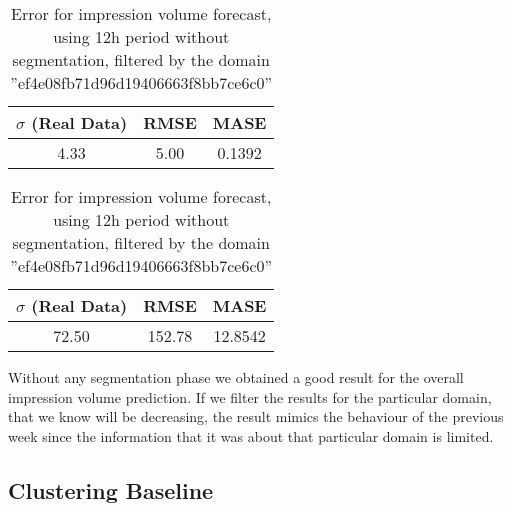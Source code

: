 \begin{table}[!ht]
\centering
\footnotesize
\begin{minipage}[t]{0.45\linewidth}
\centering
\footnotesize
\begin{tabular}{ccc}
 $\sigma$ (Real Data) & RMSE & MASE   \\ \hline
4.33 & 5.00 & 0.1392 \\
\end{tabular}

\vspace{0.5cm}

\caption[Volume
impression forecast, safari]{Error for impression volume
forecast, using 12h period without segmentation }
\label{tab:err_domain_wo_segmentation}
\end{minipage}
\quad
\begin{minipage}[t]{0.45\linewidth}
\centering
\footnotesize
\begin{tabular}{ccc}
 $\sigma$ (Real Data) & RMSE & MASE   \\ \hline
72.50 & 152.78 & 12.8542 \\
\end{tabular}

\vspace{0.5cm}

\caption[Volume
impression forecast, safari]{Error for impression volume
forecast, using 12h period without segmentation, filtered by the domain ''ef4e08fb71d96d19406663f8bb7ce6c0'' }
\label{tab:err_domain_wo_segmentation_filtered}
\end{minipage}

\end{table}

Without any segmentation phase we obtained a good result for the overall
impression volume prediction. If we filter the results for the particular
domain,
that we know will be decreasing, the result mimics the behaviour of the previous
week since the information that it was about that particular domain is limited.

\subsection*{Clustering Baseline}

